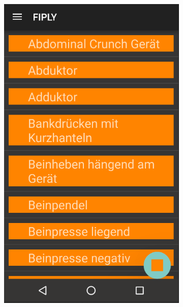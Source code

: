 \documentclass[FIPLY_base.tex]{subfiles}
\begin{document}
\begin{figure}[H]
\begin{subfigure}[h]{0.3\textwidth}
	\includegraphics[scale=0.20]{img/Uebungskatalog}
	\end{subfigure}
	\hfil
	\begin{subfigure}[h]{0.3\textwidth}

\end{subfigure}
\end{figure}
\end{document}
